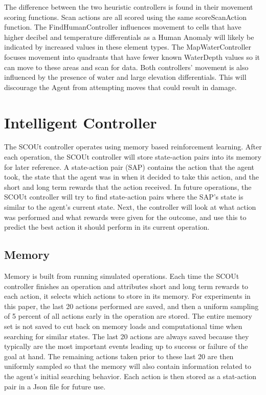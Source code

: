 The difference between the two heuristic controllers is found in their movement scoring functions.
Scan actions are all scored using the same scoreScanAction function.
The FindHumanController influences movement to cells that have higher decibel and temperature differentials as a Human Anomaly will likely be indicated by increased values in these element types.
The MapWaterController focuses movement into quadrants that have fewer known WaterDepth values so it can move to these areas and scan for data.
Both controllers' movement is also influenced by the presence of water and large elevation differentials.
This will discourage the Agent from attempting moves that could result in damage.


\section{Intelligent Controller}
The SCOUt controller operates using memory based reinforcement learning.
After each operation, the SCOUt controller will store state-action pairs into its memory for later reference.
A state-action pair (SAP) contains the action that the agent took, the state that the agent was in when it decided to take this action, and the short and long term rewards that the action received.
In future operations, the SCOUt controller will try to find state-action pairs where the SAP's state is similar to the agent's current state.
Next, the controller will look at what action was performed and what rewards were given for the outcome, and use this to predict the best action it should perform in its current operation.

\subsection{Memory}
Memory is built from running simulated operations.
Each time the SCOUt controller finishes an operation and attributes short and long term rewards to each action, it selects which actions to store in its memory.
For experiments in this paper, the last 20 actions performed are saved, and then a uniform sampling of 5 percent of all actions early in the operation are stored.
The entire memory set is not saved to cut back on memory loads and computational time when searching for similar states.
The last 20 actions are always saved because they typically are the most important events leading up to success or failure of the goal at hand.
The remaining actions taken prior to these last 20 are then uniformly sampled so that the memory will also contain information related to the agent's initial searching behavior.
Each action is then stored as a stat-action pair in a Json file for future use.


